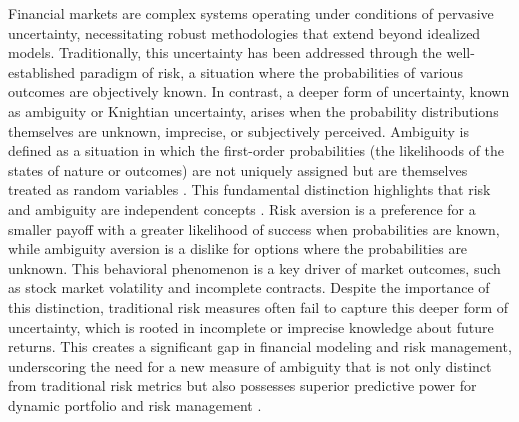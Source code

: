 \documentclass[preprint,12pt,authoryear]{elsarticle}
\begin{document}
Financial markets are complex systems operating under conditions of pervasive uncertainty, necessitating robust methodologies that extend beyond idealized models. Traditionally, this uncertainty has been addressed through the well-established paradigm of risk, a situation where the probabilities of various outcomes are objectively known. In contrast, a deeper form of uncertainty, known as ambiguity \cite{knight1921} or Knightian uncertainty, arises when the probability distributions themselves are unknown, imprecise, or subjectively perceived. Ambiguity is defined as a situation in which the first-order probabilities (the likelihoods of the states of nature or outcomes) are not uniquely assigned but are themselves treated as random variables \cite{ellsberg1961}. This fundamental distinction highlights that risk and ambiguity are independent concepts \cite{klibanoff2005}. Risk aversion is a preference for a smaller payoff with a greater likelihood of success when probabilities are known, while ambiguity aversion is a dislike for options where the probabilities are unknown. This behavioral phenomenon is a key driver of market outcomes, such as stock market volatility and incomplete contracts. Despite the importance of this distinction, traditional risk measures often fail to capture this deeper form of uncertainty, which is rooted in incomplete or imprecise knowledge about future returns. This creates a significant gap in financial modeling and risk management, underscoring the need for a new measure of ambiguity that is not only distinct from traditional risk metrics but also possesses superior predictive power for dynamic portfolio and risk management \citep{Bollerslev1988}.


\end{document}
